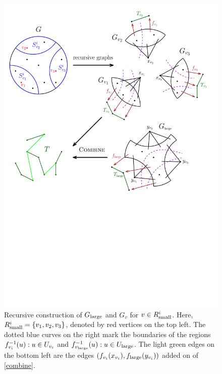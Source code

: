 \begin{figure}\centering
\includegraphics[scale=.4]{recursion.pdf}
\caption{Recursive construction of $G_{\textup{large}}$ and $G_v$ for $v\in R^i_{\textup{small}}$. Here, $R^i_{\textup{small}}=\{v_1,v_2,v_3\}$, denoted by red vertices on the top left. The dotted blue curves on the right mark the boundaries of the regions $f_{v_i}^{-1}(u):u\in U_{v_i}$ and $f_{v_{\textup{large}}}^{-1}(u):u\in U_{\textup{large}}$. The light green edges on the bottom left are the edges $(f_{v_i}(x_{v_i}),f_{\textup{large}}(y_{v_i}))$ added on  of \ref{combine}.}\label{fig:recursion}
\end{figure}


